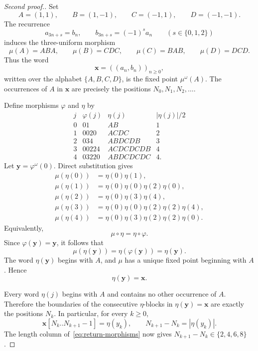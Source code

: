 \documentclass[12pt,reqno]{article}
\begin{document}
\begin{proof}[Second proof.]
Set
\[
 A=(1,1),\qquad B=(1,-1),\qquad
 C=(-1,1),\qquad D=(-1,-1).
\]
The recurrence
\[
 a_{3n+s}=b_n,\qquad b_{3n+s}=(-1)^s a_n
 \qquad(s\in\{0,1,2\})
\]
induces the three-uniform morphism
\begin{equation}\label{eq:mu}
 \mu(A)=ABA,\qquad \mu(B)=CDC,\qquad
 \mu(C)=BAB,\qquad \mu(D)=DCD.
\end{equation}
Thus the word
\[
 \mathbf x=((a_n,b_n))_{n\geq0},
\]
written over the alphabet $\{A,B,C,D\}$, is the fixed point
$\mu^\omega(A)$.  The occurrences of $A$ in $\mathbf x$ are precisely
the positions $N_0,N_1,N_2,\ldots$.

Define morphisms $\varphi$ and $\eta$ by
\begin{equation}\label{eq:return-morphisms}
\begin{array}{c|c|l|c}
 j&\varphi(j)&\eta(j)&|\eta(j)|/2\\ \hline
 0&01&AB&1\\
 1&0020&ACDC&2\\
 2&034&ABDCDB&3\\
 3&00224&ACDCDCDB&4\\
 4&03220&ABDCDCDC&4.
\end{array}
\end{equation}
Let $\mathbf y=\varphi^\omega(0)$.  Direct substitution gives
\begin{align*}
 \mu(\eta(0))&=\eta(0)\eta(1),\\
 \mu(\eta(1))&=\eta(0)\eta(0)\eta(2)\eta(0),\\
 \mu(\eta(2))&=\eta(0)\eta(3)\eta(4),\\
 \mu(\eta(3))&=\eta(0)\eta(0)\eta(2)\eta(2)\eta(4),\\
 \mu(\eta(4))&=\eta(0)\eta(3)\eta(2)\eta(2)\eta(0).
\end{align*}
Equivalently,
\[
 \mu\circ\eta=\eta\circ\varphi.
\]
Since $\varphi(\mathbf y)=\mathbf y$, it follows that
\[
 \mu(\eta(\mathbf y))
   =\eta(\varphi(\mathbf y))
   =\eta(\mathbf y).
\]
The word $\eta(\mathbf y)$ begins with $A$, and $\mu$ has a unique fixed
point beginning with $A$.  Hence
\[
 \eta(\mathbf y)=\mathbf x.
\]

Every word $\eta(j)$ begins with $A$ and contains no other occurrence of
$A$.  Therefore the boundaries of the consecutive $\eta$-blocks in
$\eta(\mathbf y)=\mathbf x$ are exactly the positions $N_k$.  In
particular, for every $k\geq0$,
\begin{equation}\label{eq:return-block}
 \mathbf x[N_k..N_{k+1}-1]=\eta(y_k),
 \qquad
 N_{k+1}-N_k=|\eta(y_k)|.
\end{equation}
The length column of~\eqref{eq:return-morphisms} now gives
$N_{k+1}-N_k\in\{2,4,6,8\}$.


\end{proof}
\end{document}
